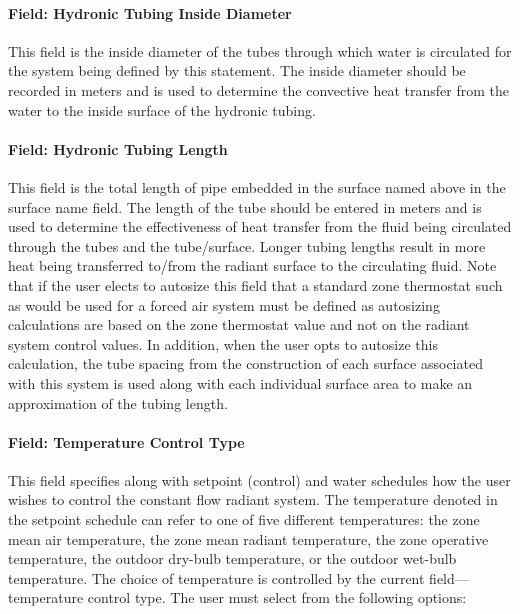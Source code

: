 \paragraph{Field: Hydronic Tubing Inside Diameter}\label{field-hydronic-tubing-inside-diameter-1-000}

This field is the inside diameter of the tubes through which water is circulated for the system being defined by this statement. The inside diameter should be recorded in meters and is used to determine the convective heat transfer from the water to the inside surface of the hydronic tubing.

\paragraph{Field: Hydronic Tubing Length}\label{field-hydronic-tubing-length-1}

This field is the total length of pipe embedded in the surface named above in the surface name field. The length of the tube should be entered in meters and is used to determine the effectiveness of heat transfer from the fluid being circulated through the tubes and the tube/surface. Longer tubing lengths result in more heat being transferred to/from the radiant surface to the circulating fluid. Note that if the user elects to autosize this field that a standard zone thermostat such as would be used for a forced air system must be defined as autosizing calculations are based on the zone thermostat value and not on the radiant system control values. In addition, when the user opts to autosize this calculation, the tube spacing from the construction of each surface associated with this system is used along with each individual surface area to make an approximation of the tubing length.

\paragraph{Field: Temperature Control Type}\label{field-temperature-control-type-1}

This field specifies along with setpoint (control) and water schedules how the user wishes to control the constant flow radiant system. The temperature denoted in the setpoint schedule can refer to one of five different temperatures: the zone mean air temperature, the zone mean radiant temperature, the zone operative temperature, the outdoor dry-bulb temperature, or the outdoor wet-bulb temperature. The choice of temperature is controlled by the current field---temperature control type. The user must select from the following options:

